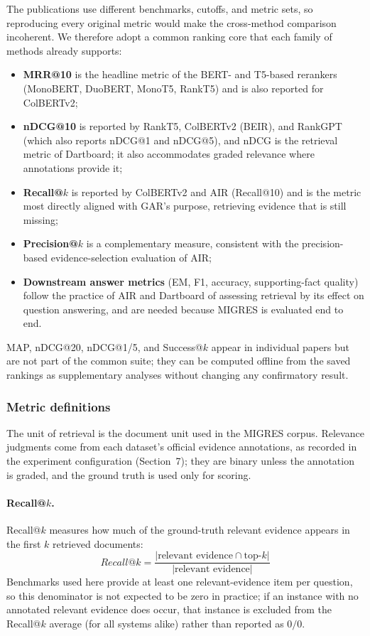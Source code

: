 \documentclass[11pt,a4paper]{article}
\begin{document}
The publications use different benchmarks, cutoffs, and metric sets, so reproducing every original metric would make the cross-method comparison incoherent. We therefore adopt a common ranking core that each family of methods already supports:
\begin{itemize}[leftmargin=1.5em]
\item \textbf{MRR@10} is the headline metric of the BERT- and T5-based rerankers (MonoBERT, DuoBERT, MonoT5, RankT5) and is also reported for ColBERTv2;
\item \textbf{nDCG@10} is reported by RankT5, ColBERTv2 (BEIR), and RankGPT (which also reports nDCG@1 and nDCG@5), and nDCG is the retrieval metric of Dartboard; it also accommodates graded relevance where annotations provide it;
\item \textbf{Recall@$k$} is reported by ColBERTv2 and AIR (Recall@10) and is the metric most directly aligned with GAR's purpose, retrieving evidence that is still missing;
\item \textbf{Precision@$k$} is a complementary measure, consistent with the precision-based evidence-selection evaluation of AIR;
\item \textbf{Downstream answer metrics} (EM, F1, accuracy, supporting-fact quality) follow the practice of AIR and Dartboard of assessing retrieval by its effect on question answering, and are needed because MIGRES is evaluated end to end.
\end{itemize}
MAP, nDCG@20, nDCG@1/5, and Success@$k$ appear in individual papers but are not part of the common suite; they can be computed offline from the saved rankings as supplementary analyses without changing any confirmatory result.

\subsubsection{Metric definitions}
\label{sec:metric-defs}

The unit of retrieval is the document unit used in the MIGRES corpus. Relevance judgments come from each dataset's official evidence annotations, as recorded in the experiment configuration (Section~7); they are binary unless the annotation is graded, and the ground truth is used only for scoring.

\paragraph{Recall@$k$.}
Recall@$k$ measures how much of the ground-truth relevant evidence appears in the first $k$ retrieved documents:
\[
\boxed{
Recall@k
=
\frac{
|\text{relevant evidence}\cap\text{top-}k|
}{
|\text{relevant evidence}|
}
}
\]
Benchmarks used here provide at least one relevant-evidence item per question, so this denominator is not expected to be zero in practice; if an instance with no annotated relevant evidence does occur, that instance is excluded from the Recall@$k$ average (for all systems alike) rather than reported as $0/0$.
\end{document}
